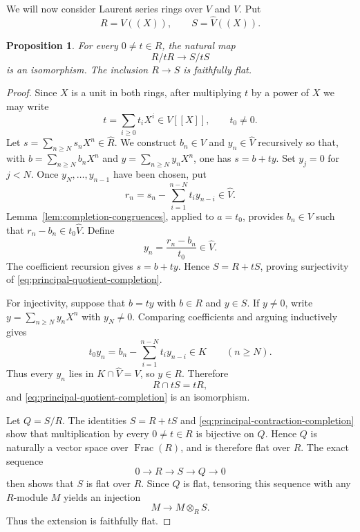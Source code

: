 \documentclass[12pt]{amsart}
\newtheorem{proposition}[theorem]{Proposition}
\theoremstyle{plain}
\newcommand{\Frac}{\operatorname{Frac}}
\begin{document}
We will now consider Laurent series rings over $V$ and $\widehat{V}$. Put
\[
  R=V((X)),\qquad S=\widehat V((X)).
\]

\begin{proposition}\label{prop:Laurent-completion-flat}
For every $0\neq t\in R$, the natural map
\begin{equation}\label{eq:principal-quotient-completion}
  R/tR\longrightarrow S/tS
\end{equation}
is an isomorphism.  The inclusion $R\to S$ is faithfully flat.
\end{proposition}

\begin{proof}
Since $X$ is a unit in both rings, after multiplying $t$ by a power of
$X$ we may write
\[
  t=\sum_{i\geq0}t_iX^i\in V[[X]],\qquad t_0\neq0.
\]
Let $s=\sum_{n\geq N}s_nX^n\in\widehat R$.  We construct
$b_n\in V$ and $y_n\in\widehat V$ recursively so that, with
$b=\sum_{n\geq N}b_nX^n$ and $y=\sum_{n\geq N}y_nX^n$, one has
$s=b+ty$.  Set $y_j=0$ for $j<N$.  Once $y_N,\ldots,y_{n-1}$ have
been chosen, put
\[
  r_n=s_n-\sum_{i=1}^{n-N}t_i y_{n-i}\in\widehat V.
\]
Lemma~\ref{lem:completion-congruences}, applied to $a=t_0$, provides
$b_n\in V$ such that $r_n-b_n\in t_0\widehat V$.  Define
\[
  y_n=\frac{r_n-b_n}{t_0}\in\widehat V.
\]
The coefficient recursion gives $s=b+ty$.  Hence
$S=R+tS$, proving surjectivity of
\eqref{eq:principal-quotient-completion}.

For injectivity, suppose that $b=ty$ with $b\in R$ and
$y\in S$.  If $y\neq0$, write
$y=\sum_{n\geq N}y_nX^n$ with $y_N\neq0$.  Comparing coefficients and
arguing inductively gives
\[
  t_0y_n=b_n-\sum_{i=1}^{n-N}t_i y_{n-i}\in K
  \qquad(n\geq N).
\]
Thus every $y_n$ lies in $K\cap\widehat V=V$, so $y\in R$.  Therefore
\begin{equation}\label{eq:principal-contraction-completion}
  R\cap tS=tR,
\end{equation}
and \eqref{eq:principal-quotient-completion} is an isomorphism.

Let $Q=S/R$.  The identities
$S=R+tS$ and
\eqref{eq:principal-contraction-completion} show that multiplication by
every $0\neq t\in R$ is bijective on $Q$.  Hence $Q$ is naturally a
vector space over $\Frac(R)$, and is therefore flat over $R$.  The
exact sequence
\[
  0\longrightarrow R\longrightarrow S
  \longrightarrow Q\longrightarrow0
\]
then shows that $S$ is flat over $R$.  Since $Q$ is flat,
tensoring this sequence with any $R$-module $M$ yields an injection
\[
  M\longrightarrow M\otimes_R S.
\]
Thus the extension is faithfully flat.
\end{proof}
\end{document}
